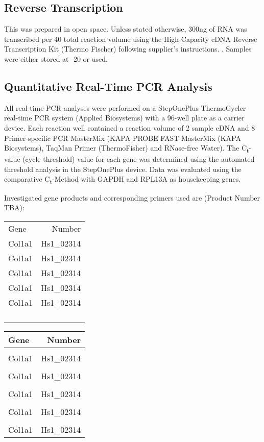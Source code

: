 \subsection{Reverse Transcription}
This was prepared in open space. Unless stated otherwise, 300ng of RNA was transcribed per 40\mul{} total reaction volume using the High-Capacity cDNA Reverse Transcription Kit (Thermo Fischer) following supplier's instructions. . Samples were either stored at -20 \degC or used. 

\subsection{Quantitative Real-Time PCR Analysis}
All real-time PCR analyses were performed on a StepOnePlus ThermoCycler real-time PCR system (Applied Biosystems) with a 96-well plate as a carrier device. Each reaction well contained a reaction volume of 2\mul{} sample cDNA and 8\mul{} Primer-specific PCR MasterMix (KAPA PROBE FAST MasterMix (KAPA Biosystems), TaqMan\textregistered{} Primer (ThermoFisher) and RNase-free Water). The C\textsubscript{t}-value (cycle threshold) value for each gene was determined using the automated threshold analysis in the StepOnePlus device. Data was evaluated using the comparative C\textsubscript{t}-Method with GAPDH and RPL13A as housekeeping genes.

Investigated gene products and corresponding primers used are (Product Number TBA): 

\begin{tabular}{|lr|}
	Gene & Number \\ 
	Col1a1 & Hs1\_02314 \\ 
	Col1a1 & Hs1\_02314 \\ 
	Col1a1 & Hs1\_02314 \\ 
	Col1a1 & Hs1\_02314 \\ 
	Col1a1 & Hs1\_02314 \\ 
	&  \\ 
	&  \\ 
	&  \\ 
	&  \\ 
	\hline 
\end{tabular} 

\begin{tabular}{lr}
		Gene & Number \\ 
		\hline 
		\rule[-1ex]{0pt}{4ex}  &  \\ 
	Col1a1 & Hs1_02314 \\ 
	\hline 
	\rule[-1ex]{0pt}{2.5ex}  &  \\ 
	Col1a1 & Hs1_02314 \\ 
	\hline 
	\rule[-1ex]{0pt}{2.5ex}  &  \\ 
	Col1a1 & Hs1_02314 \\ 
	\hline 
	\rule[-1ex]{0pt}{2.5ex}  &  \\ 
	Col1a1 & Hs1_02314 \\ 
	\hline 
	\rule[-1ex]{0pt}{2.5ex}  &  \\ 
	Col1a1 & Hs1_02314 \\ 

\end{tabular} 

